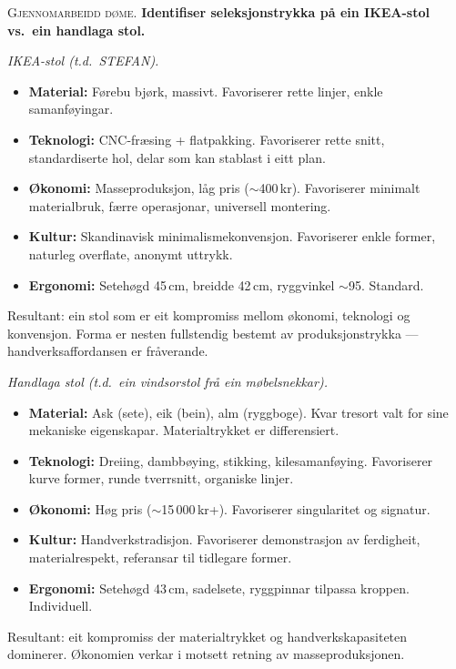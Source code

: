 \documentclass[10pt]{book}
\theoremstyle{definition}
\theoremstyle{plain}
\theoremstyle{remark}
\newenvironment{gjennomgang}%
  {\medskip\noindent\textsc{Gjennomarbeidd d\o me.}\enspace}%
  {\medskip}
\begin{document}
\begin{gjennomgang}
\textbf{Identifiser seleksjonstrykka p\aa{} ein IKEA-stol vs.\ ein handlaga stol.}

\textit{IKEA-stol (t.d.\ STEFAN).}
\begin{itemize}[nosep]
  \item \textbf{Material:} F\o rebu bj\o rk, massivt. Favoriserer rette linjer, enkle samanf\o yingar.
  \item \textbf{Teknologi:} CNC-fr\ae sing + flatpakking. Favoriserer rette snitt, standardiserte hol, delar som kan stablast i eitt plan.
  \item \textbf{\O konomi:} Masseproduksjon, l\aa g pris ($\sim$400\,kr). Favoriserer minimalt materialbruk, f\ae rre operasjonar, universell montering.
  \item \textbf{Kultur:} Skandinavisk minimalismekonvensjon. Favoriserer enkle former, naturleg overflate, anonymt uttrykk.
  \item \textbf{Ergonomi:} Seteh\o gd 45\,cm, breidde 42\,cm, ryggvinkel $\sim$95\textdegree. Standard.
\end{itemize}
Resultant: ein stol som er eit kompromiss mellom \o konomi, teknologi og konvensjon. Forma er nesten fullstendig bestemt av produksjonstrykka --- handverksaffordansen er fråverande.

\textit{Handlaga stol (t.d.\ ein vindsorstol fr\aa{} ein m\o belsnekkar).}
\begin{itemize}[nosep]
  \item \textbf{Material:} Ask (sete), eik (bein), alm (ryggboge). Kvar tresort valt for sine mekaniske eigenskapar. Materialtrykket er differensiert.
  \item \textbf{Teknologi:} Dreiing, dambb\o ying, stikking, kilesamanf\o ying. Favoriserer kurve former, runde tverrsnitt, organiske linjer.
  \item \textbf{\O konomi:} H\o g pris ($\sim$15\,000\,kr+). Favoriserer singularitet og signatur.
  \item \textbf{Kultur:} Handverkstradisjon. Favoriserer demonstrasjon av ferdigheit, materialrespekt, referansar til tidlegare former.
  \item \textbf{Ergonomi:} Seteh\o gd 43\,cm, sadelsete, ryggpinnar tilpassa kroppen. Individuell.
\end{itemize}
Resultant: eit kompromiss der materialtrykket og handverkskapasiteten dominerer. \O konomien verkar i motsett retning av masseproduksjonen.
\end{gjennomgang}
\end{document}
